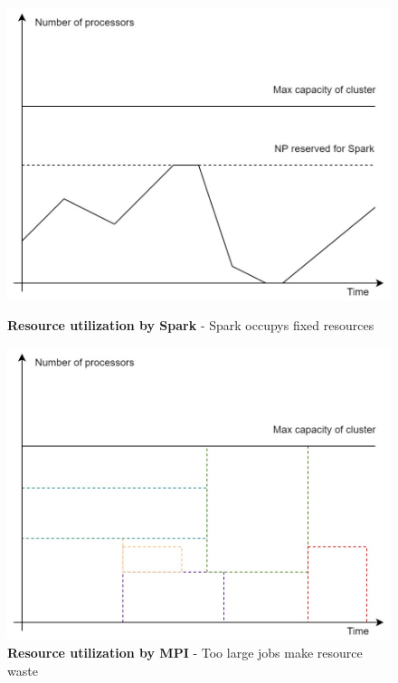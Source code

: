 \begin{figure}
    \centering
    \begin{minipage}{.5\textwidth}
      \centering
      \includegraphics[width=0.9\linewidth]{1_introduction/figures/spark_NP.jpg}
      \caption[SparkUti]{{\small\textbf{Resource utilization by Spark} - Spark occupys fixed resources}}
      \label{fig:sparkUti}
    \end{minipage}%
    \begin{minipage}{.5\textwidth}
      \centering
      \includegraphics[width=0.9\linewidth]{1_introduction/figures/MPI_batch.jpg}
      \caption[MPIUti]{{\small\textbf{Resource utilization by MPI} - Too large jobs make resource waste}}
      \label{fig:MPIUti}
    \end{minipage}
\end{figure}

